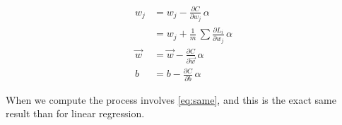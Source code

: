 \begin{align}
  w_j &= w_j - \frac{\partial C}{\partial w_j}\,\alpha\\
  &= w_j + \frac{1}{m}\,\sum \frac{\partial L_i}{\partial w_j}\,\alpha\label{eq:same}\\
  \vec{w} &= \vec{w} - \frac{\partial C}{\partial \vec{w}}\,\alpha\\
  b &= b - \frac{\partial C}{\partial b}\,\alpha
\end{align}

When we compute the process involves \ref{eq:same}, and this is the exact same result than for linear regression. 
